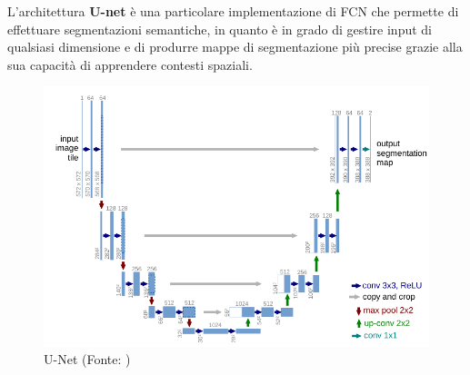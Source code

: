 L'architettura \textbf{U-net} \cite{ronneberger2015unet} è una particolare implementazione di FCN che permette di effettuare segmentazioni semantiche, in quanto è in grado di gestire input di qualsiasi dimensione e di produrre mappe di segmentazione pi\`u precise grazie alla sua capacit\`a di apprendere contesti spaziali.


\begin{figure}[!ht]
	\begin{adjustbox}{width=0.6\columnwidth, center}
		\includegraphics{./images/unet.png}
	\end{adjustbox}
	\caption{U-Net (Fonte: \cite{ronneberger2015unet})}
	\label{fig:unet}
\end{figure}




%
%
%
%
%

